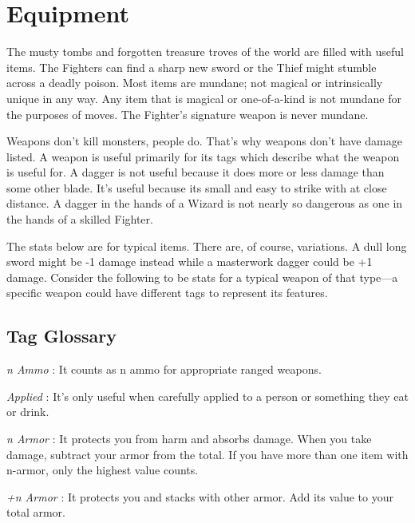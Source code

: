 \chapter{Equipment}
  
 



The musty tombs and forgotten treasure troves of the world are filled with useful items. The Fighters can find a sharp new sword or the Thief might stumble across a deadly poison. Most items are mundane; not magical or intrinsically unique in any way. Any item that is magical or one-of-a-kind is not mundane for the purposes of moves. The Fighter's signature weapon is never mundane.

 

Weapons don't kill monsters, people do. That's why weapons don't have damage listed. A weapon is useful primarily for its tags which describe what the weapon is useful for. A dagger is not useful because it does more or less damage than some other blade. It's useful because its small and easy to strike with at close distance. A dagger in the hands of a Wizard is not nearly so dangerous as one in the hands of a skilled Fighter.

 

The stats below are for typical items. There are, of course, variations. A dull long sword might be -1 damage instead while a masterwork dagger could be +1 damage. Consider the following to be stats for a typical weapon of that type—a specific weapon could have different tags to represent its features.

 
\section{Tag Glossary}    
 

{\em n Ammo} : It counts as n ammo for appropriate ranged weapons.

 

{\em Applied} : It's only useful when carefully applied to a person or something they eat or drink.

 

{\em n Armor} : It protects you from harm and absorbs damage. When you take damage, subtract your armor from the total. If you have more than one item with n-armor, only the highest value counts. 

 

{\em +n Armor} : It protects you and stacks with other armor. Add its value to your total armor.

